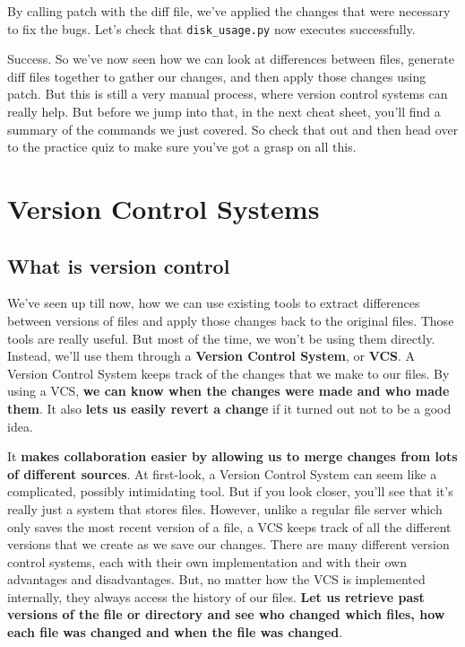 	By calling patch with the diff file, we've applied the changes that were necessary to fix the bugs. Let's check that \verb|disk_usage.py| now executes successfully.
	
	Success. So we've now seen how we can look at differences between files, generate diff files together to gather our changes, and then apply those changes using patch. But this is still a very manual process, where version control systems can really help. But before we jump into that, in the next cheat sheet, you'll find a summary of the commands we just covered. So check that out and then head over to the practice quiz to make sure you've got a grasp on all this.
	
	




\section{Version Control Systems}

	\subsection{What is version control}
	
	We've seen up till now, how we can use existing tools to extract differences between versions of files and apply those changes back to the original files. Those tools are really useful. But most of the time, we won't be using them directly. Instead, we'll use them through a \textbf{Version Control System}, or \textbf{VCS}. A Version Control System keeps track of the changes that we make to our files. By using a VCS, \textbf{we can know when the changes were made and who made them}. It also \textbf{lets us easily revert a change} if it turned out not to be a good idea. 
	
	It \textbf{makes collaboration easier by allowing us to merge changes from lots of different sources}. At first-look, a Version Control System can seem like a complicated, possibly intimidating tool. But if you look closer, you'll see that it's really just a system that stores files. 
	However, unlike a regular file server which only saves the most recent version of a file, a VCS keeps track of all the different versions that we create as we save our changes. There are many different version control systems, each with their own implementation and with their own advantages and disadvantages. But, no matter how the VCS is implemented internally, they always access the history of our files. \textbf{Let us retrieve past versions of the file or directory and see who changed which files, how each file was changed and when the file was changed}. 
	

